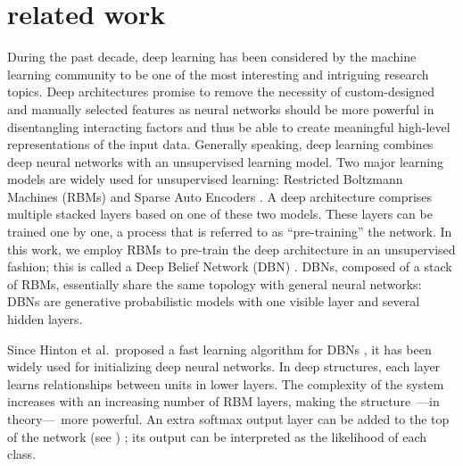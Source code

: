 \documentclass{article}
\begin{document}
%


\section{related work}
During the past decade, deep learning has been considered by the machine learning community to be one of the most interesting and intriguing research topics. Deep architectures promise to remove the necessity of custom-designed and manually selected features as neural networks should be more powerful in disentangling interacting factors and thus be able to create meaningful high-level representations of the input data. Generally speaking, deep learning combines deep neural networks with an unsupervised learning model. Two major learning models are widely used for unsupervised learning: Restricted Boltzmann Machines (RBMs) \cite{hinton2006fast}  and Sparse Auto Encoders \cite{poultney2006efficient}. A deep architecture comprises multiple stacked layers based on one of these two models. These layers can be trained one by one, a process that is referred to as ``pre-training'' the network. In this work, we employ RBMs to pre-train the deep architecture in an unsupervised fashion; this is called a Deep Belief Network (DBN) \cite{hinton2006fast}. DBNs, composed of a stack of RBMs, essentially share the same topology with general neural networks: DBNs are generative probabilistic models with one visible layer and several hidden layers. 

Since Hinton et al.\ proposed a fast learning algorithm for DBNs \cite{hinton2006fast}, it has been widely used for initializing deep neural networks. In deep structures, each layer learns relationships between units in lower layers. The complexity of the system increases with an increasing number of RBM layers, making the structure~---in theory---~more powerful. An extra softmax output layer can be added to the top of the network (see ) \cite{martinetz1993neural}; its output can be interpreted as the likelihood of each class.
\end{document}
